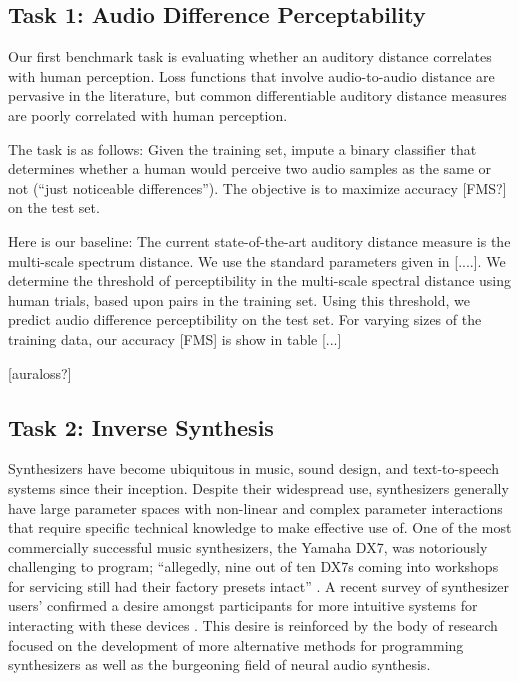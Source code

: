 
\subsection{Task 1: Audio Difference Perceptability}


Our first benchmark task is evaluating whether an auditory distance correlates with human perception. Loss functions that involve audio-to-audio distance are pervasive in the literature, but common differentiable auditory distance measures are poorly correlated with human perception.

The task is as follows: Given the training set, impute a binary classifier that determines whether a human would perceive two audio samples as the same or not (``just noticeable differences''). The objective is to maximize accuracy [FMS?] on the test set.

Here is our baseline: The current state-of-the-art auditory distance measure is the multi-scale spectrum distance. We use the standard parameters given in [....]. We determine the threshold of perceptibility in the multi-scale spectral distance using human trials, based upon pairs in the training set. Using this threshold, we predict audio difference perceptibility on the test set. For varying sizes of the training data, our accuracy [FMS] is show in table [...]

[auraloss?]



\subsection{Task 2: Inverse Synthesis}

Synthesizers have become ubiquitous in music, sound design, and text-to-speech systems since their inception. Despite their widespread use, synthesizers generally have large parameter spaces with non-linear and complex parameter interactions that require specific technical knowledge to make effective use of. One of the most commercially successful music synthesizers, the Yamaha DX7, was notoriously challenging to program; ``allegedly, nine out of ten DX7s coming into workshops for servicing still had their factory presets intact'' \cite{ seago2004critical}. A recent survey of synthesizer users’ confirmed a desire amongst participants for more intuitive systems for interacting with these devices \cite{krekovic2019insights}. This desire is reinforced by the body of research focused on the development of more alternative methods for programming synthesizers as well as the burgeoning field of neural audio synthesis. 

